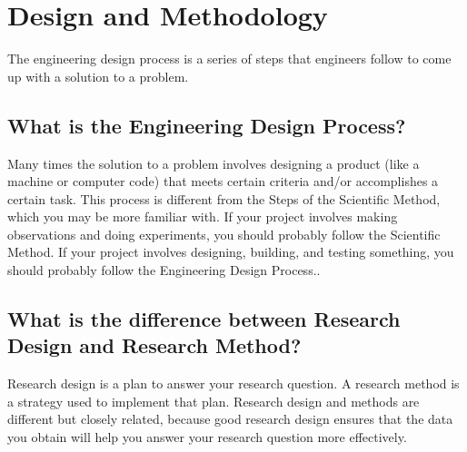 \chapter{Design and Methodology}
The engineering design process is a series of steps that engineers follow to come up with a solution to a problem.\cite{Bradshaw}
\section{What is the Engineering Design Process?}

Many times the solution to a problem involves designing a product (like a machine or computer code) that meets certain criteria and/or accomplishes a certain task. This process is different from the Steps of the Scientific Method, which you may be more familiar with. If your project involves making observations and doing experiments, you should probably follow the Scientific Method. If your project involves designing, building, and testing something, you should probably follow the Engineering Design Process.\cite{Reber}. 

\section{What is the difference between Research Design and Research Method?}

Research design is a plan to answer your research question.  A research method is a strategy used to implement that plan.  Research design and methods are different but closely related, because good research design ensures that the data you obtain will help you answer your research question more effectively.
